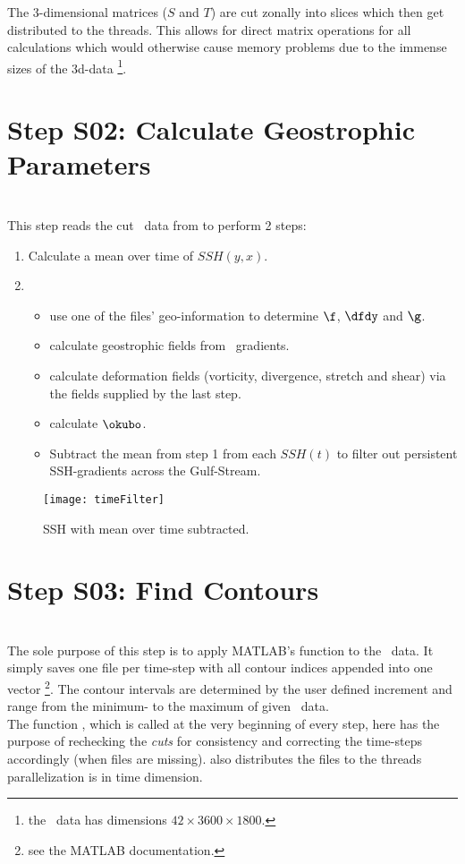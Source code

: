 The 3-dimensional matrices ($S$ and $T$) are cut zonally into slices which then get distributed to the threads. This allows for direct matrix operations for all calculations which would otherwise cause memory problems due to the immense sizes of the 3d-data \footnote{\Eg the \POP~data has dimensions $42 \times 3600 \times 1800 $.}.
\section{Step S02: Calculate Geostrophic Parameters}
\\
This step reads the cut \SSH~data from  to perform 2 steps:
\begin{enumerate}
\item
Calculate a mean over time of $SSH(y,x)$.
	\item
\begin{itemize}
	\item  use one of the files' geo-information to determine $\f$, $\dfdy$ and
$\g$.
\item
 calculate geostrophic fields from \SSH~gradients.
 \item
 calculate deformation fields (vorticity, divergence, stretch and shear) via the
fields supplied by the last step.
\item calculate $\okubo$.
\item
Subtract the mean from step 1 from each $SSH(t)$ to filter out persistent SSH-gradients \eg across the Gulf-Stream.
\end{itemize}
\end{enumerate}

\begin{figure*}
	\texttt{[image: timeFilter]}
	\caption{SSH with mean over time subtracted.}
	\label{fig:timeFilter}
\end{figure*}
 \section{Step S03: Find Contours} \label{S:03}
\\
The sole purpose of this step is to apply MATLAB's  function
to the \SSH~data. It simply saves one file per time-step with all contour indices
appended into one vector \footnote{see the MATLAB documentation.}. The contour
intervals are determined by the user defined increment and range from the
minimum- to the maximum of given \SSH~data. \\
The function , which is called at the very beginning of
every step, here has the purpose of rechecking the \textit{cuts} for
consistency and correcting the time-steps accordingly (\ie when files are
missing).  also distributes the files to the threads \ie
parallelization is in time dimension.
